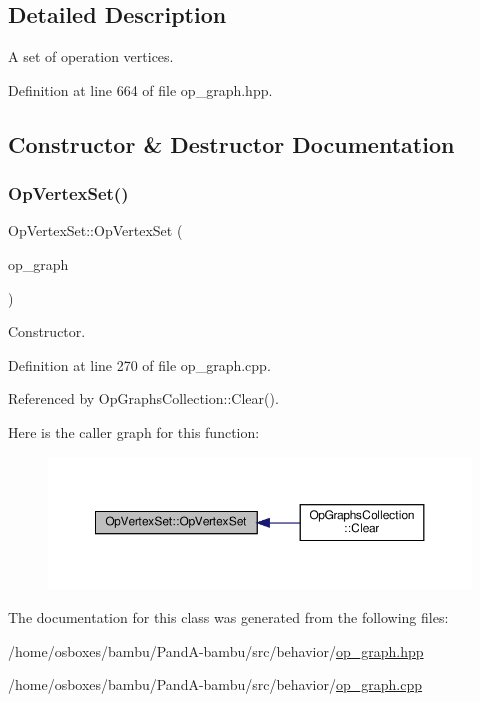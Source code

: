 \subsection{Detailed Description}
A set of operation vertices. 

Definition at line 664 of file op\+\_\+graph.\+hpp.



\subsection{Constructor \& Destructor Documentation}
\mbox{\label{classOpVertexSet_a71cec1e0a30704080af2dc377c276e3a}} 
\subsubsection{\texorpdfstring{Op\+Vertex\+Set()}{OpVertexSet()}}
{\footnotesize\ttfamily Op\+Vertex\+Set\+::\+Op\+Vertex\+Set (\begin{DoxyParamCaption}\item[{const \hyperlink{op__graph_8hpp_a9a0b240622c47584bee6951a6f5de746}{Op\+Graph\+Const\+Ref}}]{op\+\_\+graph }\end{DoxyParamCaption})\hspace{0.3cm}{\ttfamily [explicit]}}



Constructor. 



Definition at line 270 of file op\+\_\+graph.\+cpp.



Referenced by Op\+Graphs\+Collection\+::\+Clear().

Here is the caller graph for this function\+:
\nopagebreak
\begin{figure}[H]
\begin{center}
\leavevmode
\includegraphics[width=350pt]{d2/d3f/classOpVertexSet_a71cec1e0a30704080af2dc377c276e3a_icgraph}
\end{center}
\end{figure}


The documentation for this class was generated from the following files\+:\begin{DoxyCompactItemize}
\item 
/home/osboxes/bambu/\+Pand\+A-\/bambu/src/behavior/\hyperlink{op__graph_8hpp}{op\+\_\+graph.\+hpp}\item 
/home/osboxes/bambu/\+Pand\+A-\/bambu/src/behavior/\hyperlink{op__graph_8cpp}{op\+\_\+graph.\+cpp}\end{DoxyCompactItemize}
